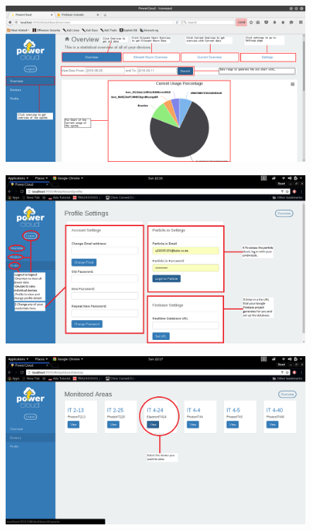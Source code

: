 \documentclass[a4paper,10pt]{article}
\begin{document}
	\begin{figure}[H]
		\includegraphics[scale=0.3]{images/Overview.png}
	\end{figure}
	
	\begin{figure}[H]
		\includegraphics[scale=0.3]{images/profile.png}
	\end{figure}
	
	\begin{figure}[H]
		\includegraphics[scale=0.3]{images/view.png}
	\end{figure}
	
\end{document}
